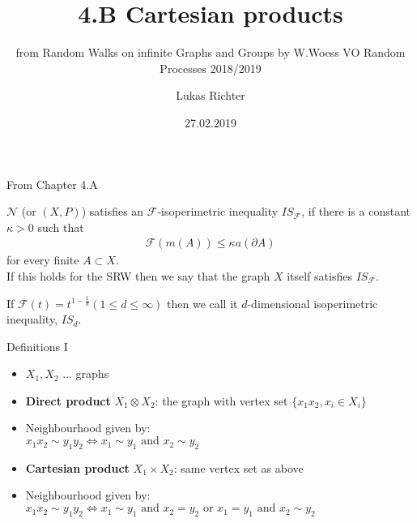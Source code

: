 \documentclass{beamer}\usepackage[]{graphicx}\usepackage[]{color}
\let\otp\titlepage
\renewcommand{\titlepage}{\otp\addtocounter{framenumber}{-1}}
\begin{document}
\title{4.B Cartesian products}
\subtitle{from Random Walks on infinite Graphs and Groups by W.Woess \newline
\newline
VO Random Processes 2018/2019}
\author{Lukas Richter}
\date[]{27.02.2019} %

\begin{frame}[plain]
 \titlepage
\end{frame}

\begin{frame}[fragile]{From Chapter 4.A}
\begin{definition}
$\mathcal{N}$ (or $(X, P)$) satisfies an $\mathcal{F}$-isoperimetric inequality $IS_{\mathcal{F}}$, if there is a constant $\kappa > 0$ such that
\begin{align*}
 \mathcal{F}(m(A)) \le \kappa a(\partial A)
\end{align*}
for every finite $A \subset X$. \\
If this holds for the SRW then we say that the graph $X$ itself satisfies $IS_{\mathcal{F}}$.
\end{definition}

If $\mathcal{F}(t) = t^{1-\frac{1}{d}} (1 \le d \le \infty)$ then we call it $d$-dimensional isoperimetric inequality, $IS_d$.

\end{frame}

\begin{frame}[fragile]{Definitions I}
\begin{itemize}
\item $X_1, X_2$ ... graphs
\item \textbf{Direct product} $X_1 \otimes X_2$: the graph with vertex set $\{x_1x_2, x_i \in X_i\}$
\item Neighbourhood given by: \\
$x_1 x_2 \sim y_1 y_2 \iff x_1\sim y_1 \text{ and } x_2 \sim y_2$
\item \textbf{Cartesian product} $X_1 \times X_2$: same vertex set as above
\item Neighbourhood given by: $x_1 x_2 \sim y_1 y_2 \iff x_1\sim y_1 \text{ and } x_2 = y_2 \text{ or } x_1 = y_1 \text{ and } x_2 \sim y_2$
\end{itemize}
\end{frame}
\end{document}
